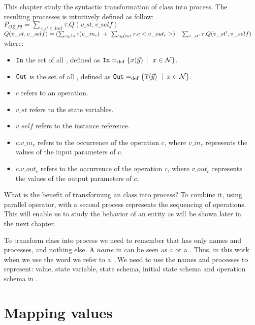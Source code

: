 This chapter study the syntactic transformation of \oz{} class into \picalc{} process. The resulting processes is intuitively defined as follow:\\
$P_{OZ\_PI} = \sum_{v\_st\in Init}^{} \tau. Q(v\_st,v\_self)$
$\\Q(v\_st,v\_self) = (\sum_{c\in In}^{} c(v\_in_{c}) \ +\ \sum_{c\in Out}^{} \tau.c<v\_out_{c}>)\ .\ \sum_{v\_st'}^{} \tau.Q(v\_st',v\_self)$
where:
\begin{itemize}
\item $\mathtt{In}$ the set of all , defined as $\inA\define\set[x\in\names]{\inp{x}{\vec{y}}}$.
\item $\mathtt{Out}$ is the set of all , defined as $\outA\define\set[x\in\names]{\out{x}{\vec{y}}}$.
\item $c$ refers to an operation.
\item $v\_st$ refers to the state variables.
\item $v\_self$ refers to the instance reference.
\item $c.v\_in_{c}$ refers to the occurrence of the operation $c$, where $v\_in_{c}$ represents the values of the input parameters of $c$.
\item $c.v\_out_{c}$ refers to the occurrence of the operation $c$, where $v\_out_{c}$ represents the values of the output parameters of $c$.
\end{itemize}
What is the benefit of transforming an \oz{} class into \picalc{} process? To combine it, using parallel operator, with a second \picalc{} process represents the sequencing of operations. This will enable us to study the behavior of an entity as will be shown later in the next chapter.

To transform \oz{} class into \picalc{} process we need to remember that  \picalc{} has only names and processes, and nothing else. A $name$ in \picalc{} can be seen as a  or a . Thus, in this work when we use the word  we refer to a \picalc{} . We need to use the names and processes to represent: value, state variable, state schema, initial state schema and operation schema in \picalc{}.
\section{Mapping values}
\label{sec_tra_mapping_values}


